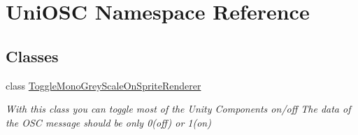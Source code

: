 \hypertarget{namespace_uni_o_s_c}{}\section{Uni\+O\+SC Namespace Reference}
\label{namespace_uni_o_s_c}
\subsection*{Classes}
\begin{DoxyCompactItemize}
\item 
class \hyperlink{class_uni_o_s_c_1_1_toggle_mono_grey_scale_on_sprite_renderer}{Toggle\+Mono\+Grey\+Scale\+On\+Sprite\+Renderer}
\begin{DoxyCompactList}\small\item\em With this class you can toggle most of the Unity Components on/off The data of the O\+SC message should be only 0(off) or 1(on) \end{DoxyCompactList}\end{DoxyCompactItemize}
